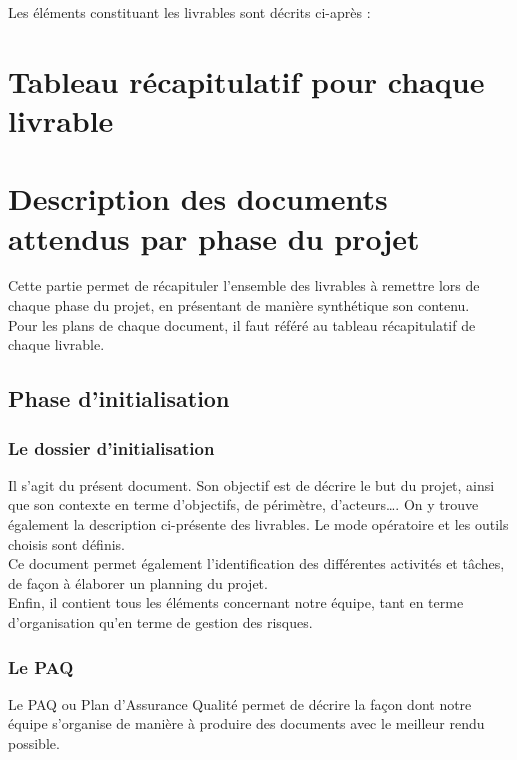 Les éléments constituant les livrables sont décrits ci-après :

\section{Tableau récapitulatif pour chaque livrable}


\section{Description des documents attendus par phase du projet}

Cette partie permet de récapituler l’ensemble des livrables à remettre lors de chaque phase du projet, en présentant de manière synthétique son contenu. \\

Pour les plans de chaque document, il faut référé au tableau récapitulatif de chaque livrable.

\subsection{Phase d’initialisation}

\subsubsection{Le dossier d’initialisation}

Il s’agit du présent document. Son objectif est de décrire le but du projet, ainsi que son contexte en terme d’objectifs, de périmètre, d’acteurs…. On y trouve également la description ci-présente des livrables. Le mode opératoire et les outils choisis sont définis. \\

Ce document permet également l’identification des différentes activités et tâches, de façon à élaborer un planning du projet. \\

Enfin, il contient tous les éléments concernant notre équipe, tant en terme d’organisation qu’en terme de gestion des risques.

\subsubsection{Le PAQ}

Le PAQ ou Plan d’Assurance Qualité permet de décrire la façon dont notre équipe s’organise de manière à produire des documents avec le meilleur rendu possible.

